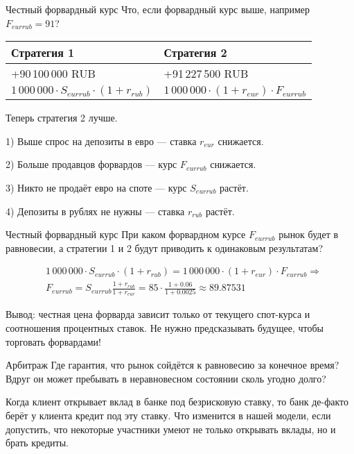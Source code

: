 \documentclass{beamer}
\begin{document}
\begin{frame}{Честный форвардный курс}
\justify
Что, если форвардный курс выше, например $F_{eurrub}=91$?


\justify
\centering
\begin{tabular}{l|l}
Стратегия 1 & Стратегия 2 \\ \hline
+90\,100\,000 RUB  & +91\,227\,500 RUB \\
$1\,000\,000 \cdot S_{eurrub} \cdot (1+r_{rub})$ & $1\,000\,000 \cdot (1+r_{eur}) \cdot F_{eurrub}$
\end{tabular}

\justify
Теперь стратегия 2 лучше. 

1) Выше спрос на депозиты в евро --- ставка $r_{eur}$ снижается.

2) Больше продавцов форвардов --- курс $F_{eurrub}$ снижается.

3) Никто не продаёт евро на споте --- курс $S_{eurrub}$ растёт. 

4) Депозиты в рублях не нужны --- ставка $r_{rub}$ растёт.
\end{frame}



\begin{frame}{Честный форвардный курс}
\justify
При каком форвардном курсе $F_{eurrub}$ рынок будет в равновесии, а стратегии 1 и 2 будут приводить к одинаковым результатам?

\begin{align*}
&1\,000\,000 \cdot S_{eurrub} \cdot (1 + r_{rub}) = 1\,000\,000 \cdot (1+r_{eur}) \cdot F_{eurrub} \Rightarrow \\
&F_{eurrub} = S_{eurrub} \frac{1 + r_{rub}}{1 + r_{eur}} = 85 \cdot \frac{1 + 0.06}{1 + 0.0025} \approx 89.87531
\end{align*}

\justify
Вывод: честная цена форварда зависит только от текущего спот-курса и соотношения процентных ставок. Не нужно предсказывать будущее, чтобы торговать форвардами!
\end{frame}



\begin{frame}{Арбитраж}
\justify
Где гарантия, что рынок сойдётся к равновесию за конечное время? Вдруг он может пребывать в неравновесном состоянии сколь угодно долго?

\justify
Когда клиент открывает вклад в банке под безрисковую ставку, то банк де-факто берёт у клиента кредит под эту ставку. Что изменится в нашей модели, если допустить, что некоторые участники умеют не только открывать вклады, но и брать кредиты.
\end{frame}
\end{document}

